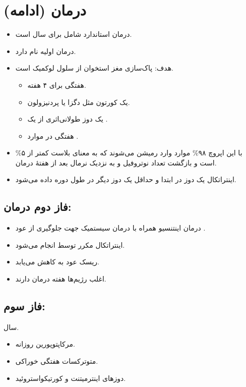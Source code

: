 \documentclass[12pt,a4paper]{article}
\begin{document}
\section*{درمان  (ادامه)}
\begin{itemize}
\item درمان استاندارد شامل  برای  سال است.
\item درمان اولیه  نام دارد.
\item هدف: پاک‌سازی مغز استخوان از سلول لوکمیک است.
\begin{itemize}
\item {} هفتگی برای ۴ هفته.
\item یک کورتون مثل دگزا یا پردنیزولون.
\item یک دوز طولانی‌اثری از یک .
\item {} هفتگی در موارد .
\end{itemize}
\item با این اپروچ ۹۸\% موارد وارد رمیشن می‌شوند که به معنای بلاست کمتر از ۵\% است و بازگشت تعداد نوتروفیل و  به نزدیک نرمال بعد از  هفتهٔ درمان.
\item {} اینتراتکال یک دوز در ابتدا و حداقل یک دوز دیگر در طول دوره داده می‌شود.
\end{itemize}
\subsection*{فاز دوم درمان: }
\begin{itemize}
\item درمان اینتنسیو  همراه با درمان سیستمیک جهت جلوگیری از عود .
\item {} اینتراتکال مکرر توسط  انجام می‌شود.
\item ریسک عود  به  کاهش می‌یابد.
\item اغلب رژیم‌ها  هفته درمان دارند.
\end{itemize}
\subsection*{فاز سوم: }
 سال.
\begin{itemize}
\item مرکاپتوپورین روزانه.
\item متوترکسات هفتگی خوراکی.
\item دوزهای اینترمیتنت  و کورتیکواستروئید.
\end{itemize}
\end{document}
